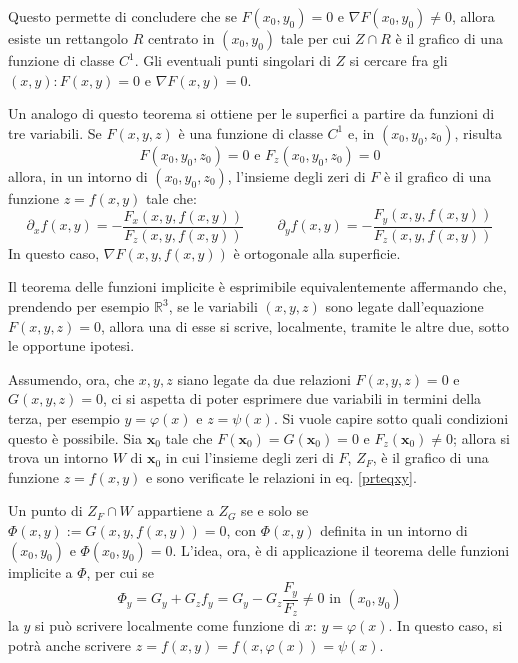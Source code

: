 \documentclass[11pt, a4paper]{scrartcl}
\theoremstyle{definition}
\numberwithin{esempio}{section}
\theoremstyle{definition}
\numberwithin{obs}{section}
\numberwithin{nota}{section}
\numberwithin{equation}{subsection}
\begin{document}
Questo permette di concludere che se $F(x_0,y_0) = 0$ e $\nabla F (x_0,y_0) \neq 0 $, allora esiste un rettangolo $R$ centrato in $(x_0,y_0)$ tale per cui $Z \cap R$ \`e il grafico di una funzione di classe $C^1$.
Gli eventuali punti singolari di $Z$ si cercare fra gli $(x,y) : F(x,y) = 0 $ e $\nabla F(x,y) = 0$.

Un analogo di questo teorema si ottiene per le superfici a partire da funzioni di tre variabili. 
Se $F(x,y,z)$ \`e una funzione di classe $C^1$ e, in $(x_0,y_0,z_0)$, risulta
\[
F (x_0,y_0,z_0) = 0 \text{ e } F_z(x_0,y_0,z_0)=0
\] 
allora, in un intorno di $(x_0,y_0,z_0)$, l'insieme degli zeri di $F$ \`e il grafico di una funzione $z=f(x,y)$ tale che:
\begin{equation}\label{prteqxy}
	\partial _x f (x,y) = - \frac{F_x(x,y,f(x,y))}{F_z(x,y,f(x,y))} \hspace{1cm} \partial _y f(x,y) = - \frac{F_y(x,y,f(x,y))}{F_z(x,y,f(x,y))}
\end{equation}
In questo caso, $\nabla F(x,y,f(x,y))$ \`e ortogonale alla superficie.


Il teorema delle funzioni implicite \`e esprimibile equivalentemente affermando che, prendendo per esempio $\mathbb{R}^3$, se le variabili $(x,y,z)$ sono legate dall'equazione $F(x,y,z) = 0$, allora una di esse si scrive, localmente, tramite le altre due, sotto le opportune ipotesi.

Assumendo, ora, che $x,y,z$ siano legate da due relazioni $F(x,y,z) = 0$ e $G(x,y,z) = 0$, ci si aspetta di poter esprimere due variabili in termini della terza, per esempio $y = \varphi (x)$ e $z = \psi (x)$.
Si vuole capire sotto quali condizioni questo \`e possibile.
Sia $\mathbf{x} _0$ tale che $F(\mathbf{x} _0) = G(\mathbf{x} _0) = 0$ e $F_z (\mathbf{x} _0) \neq 0$; allora si trova un intorno $W$ di $\mathbf{x} _0$ in cui l'insieme degli zeri di $F$, $Z_F$, \`e il grafico di una funzione $z=f(x,y)$ e sono verificate le relazioni in eq. \ref{prteqxy}.

Un punto di $Z_F \cap W	$ appartiene a $Z_G$ se e solo se $\Phi(x,y):= G(x,y,f(x,y))=0$, con $\Phi(x,y)$ definita in un intorno di $(x_0,y_0)$ e $\Phi(x_0,y_0)=0$.
L'idea, ora, \`e di applicazione il teorema delle funzioni implicite a $\Phi$, per cui se 
\[
\Phi_y = G_y + G_z f_y = G_y - G_z \frac{F_y}{F_z} \neq 0 \text{ in } (x_0,y_0)
\] 
la $y$ si pu\`o scrivere localmente come funzione di $x$: $y=  \varphi (x)$.
In questo caso, si potr\`a anche scrivere $z= f(x,y) = f(x,\varphi (x))=\psi (x)$.
\end{document}
